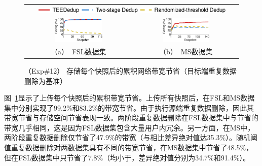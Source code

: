 \begin{figure}[!htb]
    \centering
    \begin{tabular}{@{\ }c@{\ }c}
    \multicolumn{2}{c}{\includegraphics[width=0.9\textwidth]{pic/sgxdedup/upload_traffic_legend.pdf}} \\
    \hspace{-0.1in}
    \includegraphics[width=0.47\textwidth]{pic/sgxdedup/upload_traffic_fsl.pdf} &
    \includegraphics[width=0.47\textwidth]{pic/sgxdedup/upload_traffic_ms.pdf}\\ 
    \mbox{\small （a） FSL数据集} &
    \mbox{\small （b） MS数据集}
    \end{tabular}
    \caption{（Exp\#12） 存储每个快照后的累积网络带宽节省（目标端重复数据删除为基准）}
    \label{fig:sgxdedup-uploadTraffic}
\end{figure}

图~\ref{fig:sgxdedup-uploadTraffic}显示了上传每个快照后的累积带宽节省。上传所有快照后，\sysnameS 在FSL和MS数据集中分别实现了99.2\%和83.2\%的带宽节省。由于\sysnameS 执行源端重复数据删除，因此其带宽节省与存储空间节省表现一致。两阶段重复数据删除在FSL数据集中与\sysnameS 节省的带宽几乎相同，这是因为FSL数据集包含大量用户内冗余。另一方面，在MS中，两阶段重复数据删除仅节省了47.9\%的带宽（与\sysnameS 相比差异绝对值达35.3\%）。随机阈值重复数据删除对两数据集具有不同的带宽节省，在MS数据集中节省了48.5\%，但在FSL数据集中只节省了7.8\%（均小于\sysnameS，差异绝对值分别为34.7\%和91.4\%）。

